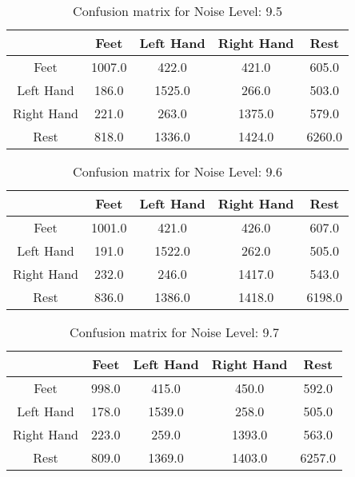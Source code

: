 \begin{table}[!htbp]
    \centering
    \begin{tabular}{|c||c|c|c|c|}
        \hline
		 & Feet & Left Hand & Right Hand & Rest \\
        \hline
        \hline
        Feet & 1007.0 & 422.0 & 421.0 & 605.0 \\
        \hline
        Left Hand & 186.0 & 1525.0 & 266.0 & 503.0 \\
        \hline
        Right Hand & 221.0 & 263.0 & 1375.0 & 579.0 \\
        \hline
        Rest & 818.0 & 1336.0 & 1424.0 & 6260.0 \\
        \hline
    \end{tabular}
    \caption{Confusion matrix for Noise Level: 9.5}
\end{table}

\begin{table}[!htbp]
    \centering
    \begin{tabular}{|c||c|c|c|c|}
        \hline
		 & Feet & Left Hand & Right Hand & Rest \\
        \hline
        \hline
        Feet & 1001.0 & 421.0 & 426.0 & 607.0 \\
        \hline
        Left Hand & 191.0 & 1522.0 & 262.0 & 505.0 \\
        \hline
        Right Hand & 232.0 & 246.0 & 1417.0 & 543.0 \\
        \hline
        Rest & 836.0 & 1386.0 & 1418.0 & 6198.0 \\
        \hline
    \end{tabular}
    \caption{Confusion matrix for Noise Level: 9.6}
\end{table}

\begin{table}[!htbp]
    \centering
    \begin{tabular}{|c||c|c|c|c|}
        \hline
		 & Feet & Left Hand & Right Hand & Rest \\
        \hline
        \hline
        Feet & 998.0 & 415.0 & 450.0 & 592.0 \\
        \hline
        Left Hand & 178.0 & 1539.0 & 258.0 & 505.0 \\
        \hline
        Right Hand & 223.0 & 259.0 & 1393.0 & 563.0 \\
        \hline
        Rest & 809.0 & 1369.0 & 1403.0 & 6257.0 \\
        \hline
    \end{tabular}
    \caption{Confusion matrix for Noise Level: 9.7}
\end{table}

